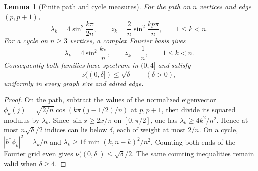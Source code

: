 \documentclass[11pt]{article}
\newtheorem{lemma}[theorem]{Lemma}
\begin{document}
\begin{lemma}[Finite path and cycle measures]\label{lem:measures}
For the path on $n$ vertices and edge $(p,p+1)$,
\[
 \lambda_k=4\sin^2\frac{k\pi}{2n},\qquad
 z_k=\frac2n\sin^2\frac{kp\pi}{n},\qquad 1\le k<n.
\]
For a cycle on $n\ge3$ vertices, a complex Fourier basis gives
\[
 \lambda_k=4\sin^2\frac{k\pi}{n},\qquad z_k=\frac1n,
 \qquad 1\le k<n.
\]
Consequently both families have spectrum in $(0,4]$ and satisfy
\begin{equation}\label{eq:cdf}
                 \nu((0,\delta])\le\sqrt\delta\qquad(\delta>0),
\end{equation}
uniformly in every graph size and edited edge.
\end{lemma}
\begin{proof}
On the path, subtract the values of the normalized eigenvector
$\phi_k(j)=\sqrt{2/n}\cos(k\pi(j-1/2)/n)$ at $p,p+1$, then divide
its squared modulus by $\lambda_k$. Since
$\sin x\ge2x/\pi$ on $[0,\pi/2]$, one has
$\lambda_k\ge4k^2/n^2$. Hence at most $n\sqrt\delta/2$ indices
can lie below $\delta$, each of weight at most $2/n$.
On a cycle, $|b^*\phi_k|^2=\lambda_k/n$ and
$\lambda_k\ge16\min(k,n-k)^2/n^2$. Counting both ends of the
Fourier grid even gives $\nu((0,\delta])\le\sqrt\delta/2$.
The same counting inequalities remain valid when $\delta\ge4$.
\end{proof}
\end{document}
